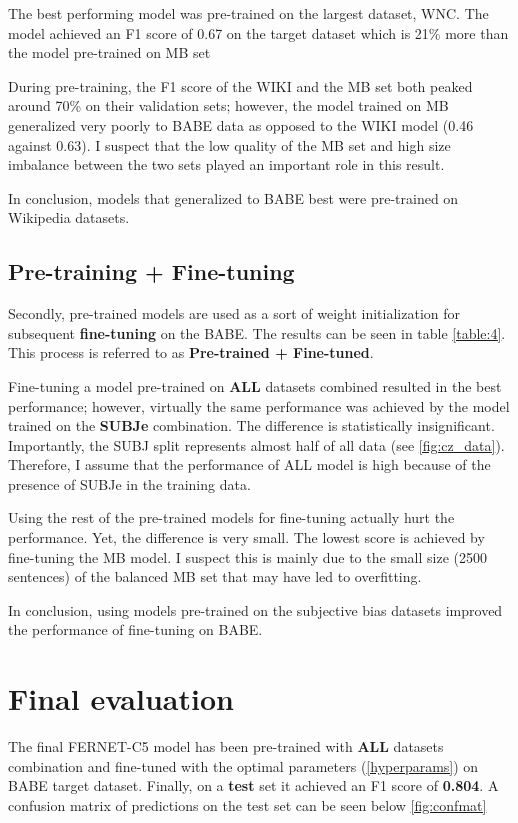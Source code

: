 The best performing model was pre-trained on the largest dataset, WNC. The model achieved an F1 score of 0.67 on the target dataset which is 21\% more than the model pre-trained on MB set

During pre-training, the F1 score of the WIKI and the MB set both peaked around 70\% on their validation sets; however, the model trained on MB generalized very poorly to BABE data as opposed to the WIKI model (0.46 against 0.63). I suspect that the low quality of the MB set and high size imbalance between the two sets played an important role in this result.

In conclusion, models that generalized to BABE best were pre-trained on Wikipedia datasets.

\subsection{Pre-training + Fine-tuning}
Secondly, pre-trained models are used as a sort of weight initialization for subsequent \textbf{fine-tuning} on the BABE. The results can be seen in table \ref{table:4}. This process is referred to as \textbf{Pre-trained + Fine-tuned}.

Fine-tuning a model pre-trained on \textbf{ALL} datasets combined resulted in the best performance; however, virtually the same performance was achieved by the model trained on the \textbf{SUBJe} combination. The difference is statistically insignificant. Importantly, the SUBJ split represents almost half of all data (see \ref{fig:cz_data}). Therefore, I assume that the performance of ALL model is high because of the presence of SUBJe in the training data.

Using the rest of the pre-trained models for fine-tuning actually hurt the performance. Yet, the difference is very small. The lowest score is achieved by fine-tuning the MB model. I suspect this is mainly due to the small size (2500 sentences) of the balanced MB set that may have led to overfitting.

In conclusion, using models pre-trained on the subjective bias datasets improved the performance of fine-tuning on BABE.




\section{Final evaluation}\label{classifier}
The final FERNET-C5 model has been pre-trained with \textbf{ALL} datasets combination and fine-tuned with the optimal parameters (\ref{hyperparams}) on BABE target dataset. Finally, on a \textbf{test} set it achieved an F1 score of \textbf{0.804}. A confusion matrix of predictions on the test set can be seen below \ref{fig:confmat}

